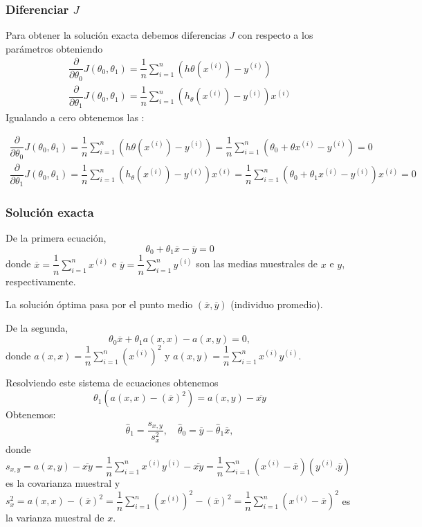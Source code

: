 \subsubsection{Diferenciar $J$}

Para obtener la solución exacta debemos diferencias $J$ con respecto a los parámetros obteniendo \[ \begin{array}{l}
	\dfrac{\partial}{\partial \theta_0}J(\theta_0,\theta_1)=\dfrac{1}{n}\sum_{i=1}^{n}\left(h\theta\left(x^{(i)}\right)-y^{(i)}\right)\\
	\dfrac{\partial}{\partial\theta_1}J(\theta_0,\theta_1)=\dfrac{1}{n}\sum_{i=1}^{n}\left(h_\theta\left(x^{(i)}\right)-y^{(i)}\right)x^{(i)}
\end{array} \]
Igualando a cero obtenemos las :

$\begin{array}{l}
	\dfrac{\partial}{\partial \theta_0}J(\theta_0,\theta_1)=\dfrac{1}{n}\sum_{i=1}^{n}\left(h\theta\left(x^{(i)}\right)-y^{(i)}\right)=\dfrac{1}{n}\sum_{i=1}^{n}\left(\theta_0+\theta x^{(i)}-y^{(i)}\right)=0\\
	\dfrac{\partial}{\partial\theta_1}J(\theta_0,\theta_1)=\dfrac{1}{n}\sum_{i=1}^{n}\left(h_\theta\left(x^{(i)}\right)-y^{(i)}\right)x^{(i)}=\dfrac{1}{n}\sum_{i=1}^{n}\left(\theta_0+\theta_1x^{(i)}-y^{(i)}\right)x^{(i)}=0
\end{array}$
\subsubsection{Solución exacta}
De la primera ecuación, \[ \theta_0+\theta_1\overline{x}-\overline{y}=0 \]donde $\overline{x}=\dfrac{1}{n}\sum_{i=1}^{n}x^{(i)}$ e $\overline{y}=\dfrac{1}{n}\sum_{i=1}^{n}y^{(i)}$ son las medias muestrales de $x$ e $y$, respectivamente.

La solución óptima pasa por el punto medio $(\overline{x},\overline{y})$ (individuo promedio).

De la segunda, \[ \theta_0\overline{x}+\theta_1a(x,x)-a(x,y)=0,\] donde $a(x,x)=\dfrac{1}{n}\sum_{i=1}^{n}\left(x^{(i)}\right)^2$ y $a(x,y)=\dfrac{1}{n}\sum_{i=1}^{n}x^{(i)}y^{(i)}$.

Resolviendo este sistema de ecuaciones obtenemos \[ \theta_1\left(a(x,x)-(\overline{x})^2\right)=a(x,y)-\overline{xy} \]
Obtenemos: \[ \hat{\theta}_1=\dfrac{s_{x,y}}{s_x^2},\quad \hat{\theta}_0=\overline{y}-\hat{\theta}_1\overline{x}, \] donde $s_{x,y}=a(x,y)-\overline{xy}=\dfrac{1}{n}\sum_{i=1}^{n}x^{(i)}y^{(i)}-\overline{xy}=\dfrac{1}{n}\sum_{i=1}^{n}\left(x^{(i)}-\overline{x}\right)\left(y^{(i)}.\overline{y}\right)$ es la covarianza muestral y $s_x^2=a(x,x)-(\overline{x})^2=\dfrac{1}{n}\sum_{i=1}^{n}\left(x^{(i)}\right)^2-(\overline{x})^2=\dfrac{1}{n}\sum_{i=1}^{n}\left(x^{(i)}-\overline{x}\right)^2$ es la varianza muestral de $x$.

